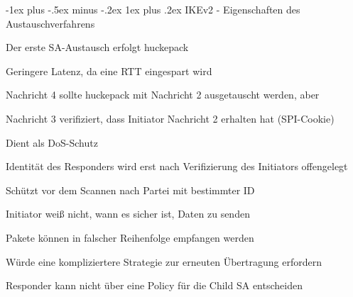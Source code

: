 \documentclass[a4paper]{article}
\makeatletter
\renewcommand{\subsubsection}{\@startsection{subsubsection}{3}{0mm}%
 {-1ex plus -.5ex minus -.2ex}%
 {1ex plus .2ex}%
 {\normalfont\small\bfseries}}
\makeatother
\begin{document}
\begin{multicols}{3}
      \subsubsection{IKEv2 - Eigenschaften des Austauschverfahrens}
      \begin{itemize*}
            \item Der erste SA-Austausch erfolgt huckepack
            \item Geringere Latenz, da eine RTT eingespart wird
            \item Nachricht 4 sollte huckepack mit Nachricht 2 ausgetauscht werden, aber
            \item Nachricht 3 verifiziert, dass Initiator Nachricht 2 erhalten hat (SPI-Cookie)
            \begin{itemize*}
                  \item Dient als DoS-Schutz%
            \end{itemize*}
            \item Identität des Responders wird erst nach Verifizierung des Initiators offengelegt
            \begin{itemize*}
                  \item Schützt vor dem Scannen nach Partei mit bestimmter ID
            \end{itemize*}
            \item Initiator weiß nicht, wann es sicher ist, Daten zu senden
            \begin{itemize*}
                  \item Pakete können in falscher Reihenfolge empfangen werden
            \end{itemize*}
            \item Würde eine kompliziertere Strategie zur erneuten Übertragung erfordern
            \item Responder kann nicht über eine Policy für die Child SA entscheiden
      \end{itemize*}


\end{multicols}
\end{document}
